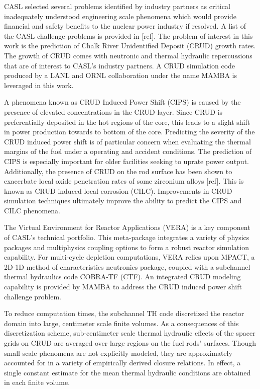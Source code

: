 CASL selected several problems identified by industry partners as critical
inadequately understood engineering scale phenomena which would provide
financial and safety benefits to the nuclear power industry if resolved.  A
list of the CASL challenge problems is provided in [ref].  The problem of
interest in this work is the prediction of Chalk River Unidentified Deposit
(CRUD) growth rates.  The growth of CRUD comes with neutronic and thermal
hydraulic repercussions that are of interest to CASL's industry partners.
A CRUD simulation code produced by a LANL
and ORNL collaboration \cite{collins16} under the name MAMBA is leveraged in this work.

A phenomena known as CRUD Induced Power Shift (CIPS) is caused by the presence
of elevated  concentrations in the CRUD layer.  Since CRUD is preferentially
deposited in the hot regions of the core, this leads to a slight shift in
power production towards to bottom of the core.  Predicting the severity of the
CRUD induced power shift is of particular concern when evaluating the thermal
margins of the fuel under a operating and accident conditions.  The prediction
of CIPS is especially important for older facilities seeking to uprate power
output.  Additionally, the presence of CRUD on the rod surface has been shown
to exacerbate local oxide penetration rates of some zirconium alloys [ref].
This is known as CRUD induced local corrosion (CILC).  Improvements in CRUD
simulation techniques ultimately improve the ability to predict the CIPS and
CILC phenomena.

The Virtual Environment for Reactor Applications (VERA) is a key component of
CASL's technical portfolio.  This meta-package integrates a variety of physics
packages and multiphysics coupling options to form a robust reactor simulation
capability.  For multi-cycle depletion computations, VERA relies upon MPACT, a
2D-1D method of characteristics neutronics package, coupled with a subchannel
thermal hydraulics code COBRA-TF (CTF).  An integrated CRUD modeling capability
is provided by MAMBA to address the CRUD induced power shift challenge problem.

To reduce computation times, the subchannel TH code discretized the reactor
domain into large, centimeter scale finite volumes. As a consequences of this
discretization scheme, sub-centimeter scale thermal hydraulic effects of the
spacer grids on CRUD are averaged over large regions on the fuel rods'
surfaces.  Though small scale phenomena are not explicitly modeled, they are
approximately accounted for in a variety of empirically derived closure
relations.  In effect, a single constant estimate for the mean thermal
hydraulic conditions are obtained in each finite volume.

